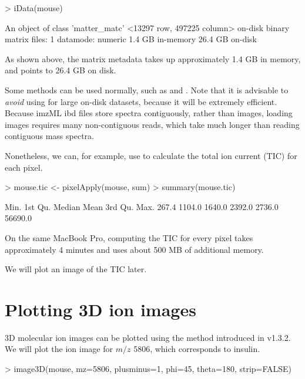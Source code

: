 \documentclass[a4paper]{article}
\begin{document}
\begin{Schunk}
\begin{Sinput}
> iData(mouse)
\end{Sinput}
\begin{Soutput}
An object of class 'matter_matc'
  <13297 row, 497225 column> on-disk binary matrix
    files: 1
    datamode: numeric
    1.4 GB in-memory
    26.4 GB on-disk
\end{Soutput}
\end{Schunk}

As shown above, the matrix metadata takes up approximately 1.4 GB in memory, and points to 26.4 GB on disk.

Some  methods can be used normally, such as  and . Note that it is advisable to \textit{avoid} using  for large on-disk datasets, because it will be extremely efficient. Because imzML ibd files store spectra contiguously, rather than images, loading images requires many non-contiguous reads, which take much longer than reading contiguous mass spectra.

Nonetheless, we can, for example, use  to calculate the total ion current (TIC) for each pixel.

\begin{Schunk}
\begin{Sinput}
> mouse.tic <- pixelApply(mouse, sum)
> summary(mouse.tic)
\end{Sinput}
\begin{Soutput}
   Min. 1st Qu.  Median    Mean 3rd Qu.    Max. 
  267.4  1104.0  1640.0  2392.0  2736.0 56690.0 
\end{Soutput}
\end{Schunk}

On the same MacBook Pro, computing the TIC for every pixel takes approximately 4 minutes and uses about 500 MB of additional memory.

We will plot an image of the TIC later.

\section{Plotting 3D ion images}

3D molecular ion images can be plotted using the  method introduced in  v1.3.2. We will plot the ion image for $m/z$ 5806, which corresponds to insulin.

\begin{Schunk}
\begin{Sinput}
> image3D(mouse, mz=5806, plusminus=1, phi=45, theta=180, strip=FALSE)
\end{Sinput}
\end{Schunk}
\end{document}
